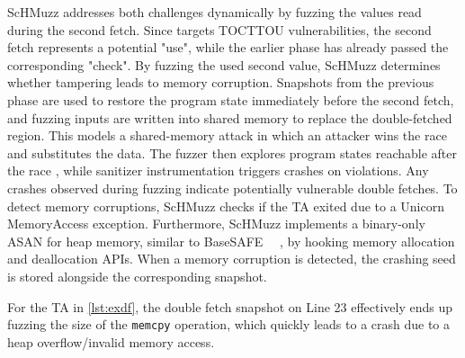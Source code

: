 \documentclass[conference]{IEEEtran} %
\newcommand{\sysname}{ScHMuzz\xspace}
\newcommand{\stageone}{Exploration\xspace}
\providecommand{\DIFaddtex}[1]{{\protect\color{blue} \sf #1}} %
\providecommand{\DIFdeltex}[1]{{\protect\color{red} \scriptsize #1}} %
\providecommand{\DIFaddbegin}{} %
\providecommand{\DIFaddend}{} %
\providecommand{\DIFdelbegin}{} %
\providecommand{\DIFdelend}{} %
\providecommand{\DIFadd}[1]{\texorpdfstring{\DIFaddtex{#1}}{#1}} %
\providecommand{\DIFdel}[1]{\texorpdfstring{\DIFdeltex{#1}}{}} %
\begin{document}
\sysname addresses both challenges dynamically by fuzzing the values read during the second fetch. 
\DIFdelbegin \DIFdel{Since }%
\DIFdel{targets TOCTTOU vulnerabilities, the second fetch represents a potential "use", while the 
earlier }%
\DIFdel{phase has already passed the corresponding "check". }\DIFdelend %
By fuzzing the \DIFdelbegin \DIFdel{used }\DIFdelend \DIFaddbegin \DIFadd{second }\DIFaddend value, 
\sysname determines whether tampering leads to memory corruption. Snapshots from the previous phase 
are used to restore the program state immediately before the second fetch, and fuzzing inputs are 
written into shared memory to replace the double-fetched region. This models a shared-memory attack 
in which an attacker wins the race and substitutes the data. The fuzzer then explores program states 
reachable after the race\DIFdelbegin \DIFdel{, while sanitizer instrumentation triggers crashes on violations}\DIFdelend . Any crashes 
observed during fuzzing indicate potentially vulnerable double fetches. 
\DIFaddbegin \DIFadd{To detect memory corruptions, }\sysname \DIFadd{checks if 
the TA exited due to a Unicorn MemoryAccess exception. Furthermore, }\sysname \DIFadd{implements a binary-only ASAN for heap memory, 
similar to BaseSAFE~\mbox{%
\cite{basesafe}}\hskip0pt%
, by hooking memory allocation and deallocation APIs. When a memory corruption is detected, 
the crashing seed is stored alongside the corresponding snapshot. 
}\DIFaddend 

For the TA in \autoref{lst:exdf}, the double fetch snapshot on Line 23 
effectively ends up fuzzing the size of the \texttt{memcpy} operation, which 
quickly leads to a crash due to a heap overflow/invalid memory access.
\end{document}
